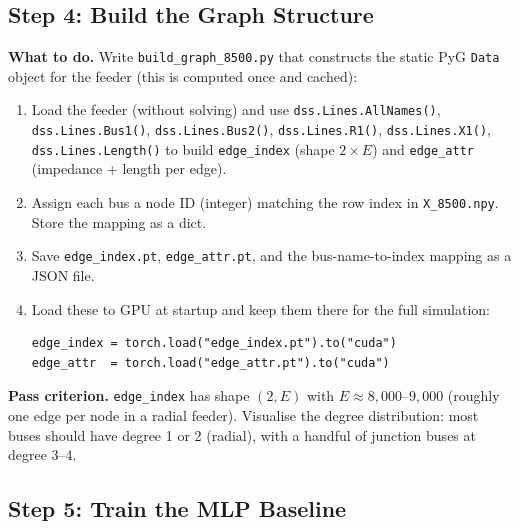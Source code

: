 \documentclass[11pt]{article}
\begin{document}
\subsection{Step 4: Build the Graph Structure}
\label{subsec:step4}

\noindent\textbf{What to do.}
Write \texttt{build\_graph\_8500.py} that constructs the static PyG
\texttt{Data} object for the feeder (this is computed once and cached):

\begin{enumerate}[itemsep=2pt]
  \item Load the feeder (without solving) and use
    \texttt{dss.Lines.AllNames()}, \texttt{dss.Lines.Bus1()},
    \texttt{dss.Lines.Bus2()}, \texttt{dss.Lines.R1()},
    \texttt{dss.Lines.X1()}, \texttt{dss.Lines.Length()} to build
    \texttt{edge\_index} (shape $2 \times E$) and \texttt{edge\_attr}
    (impedance + length per edge).
  \item Assign each bus a node ID (integer) matching the row index in
    \texttt{X\_8500.npy}.  Store the mapping as a dict.
  \item Save \texttt{edge\_index.pt}, \texttt{edge\_attr.pt}, and
    the bus-name-to-index mapping as a JSON file.
  \item Load these to GPU at startup and keep them there for the full
    simulation:
    \begin{verbatim}
edge_index = torch.load("edge_index.pt").to("cuda")
edge_attr  = torch.load("edge_attr.pt").to("cuda")
    \end{verbatim}
\end{enumerate}

\noindent\textbf{Pass criterion.}
\texttt{edge\_index} has shape $(2, E)$ with $E \approx 8{,}000$--$9{,}000$
(roughly one edge per node in a radial feeder).  Visualise the degree
distribution: most buses should have degree 1 or 2 (radial), with a handful
of junction buses at degree 3--4.

\subsection{Step 5: Train the MLP Baseline}
\label{subsec:step5}
\end{document}
